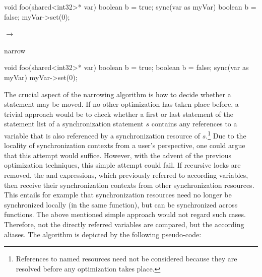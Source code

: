 \begin{minipage}{1\textwidth}
\begin{center}
\begin{minipage}{0.35\textwidth}
\begin{ccode}{}
void foo(shared<int32>* var) {
  boolean b = true;
  sync(var as myVar) {
    boolean b = false;
    myVar->set(0);
  }
}
\end{ccode}
\end{minipage}
\begin{minipage}{0.17\textwidth}
\begin{center}
$\longrightarrow$

narrow
\end{center}
\end{minipage}
\begin{minipage}{0.45\textwidth}
\begin{ccode}{}
void foo(shared<int32>* var) {
  boolean b = true;
  {
    boolean b = false;
    sync(var as myVar) { myVar->set(0); }
  }
}
\end{ccode}
\end{minipage}
\end{center}
\end{minipage}
\vspace{4mm}

The crucial aspect of the narrowing algorithm is how to decide whether a statement may be moved. If no other optimization has taken place before, a trivial approach would be to check whether a first or last statement of the statement list of a synchronization statement $s$ contains any references to a variable that is also referenced by a synchronization resource of $s$.\footnote{References to named resources need not be considered because they are resolved before any optimization takes place.} Due to the locality of synchronization contexts from a user's perspective, one could argue that this attempt would suffice. However, with the advent of the previous optimization techniques, this simple attempt could fail. If recursive locks are removed, the  and  expressions, which previously referred to according variables, then receive their synchronization contexts from other synchronization resources. This entails for example that synchronization resources need no longer be synchronized locally (in the same function), but can be synchronized across functions. The above mentioned simple approach would not regard such cases. Therefore, not the directly referred variables are compared, but the according aliases. The algorithm is depicted by the following pseudo-code:

